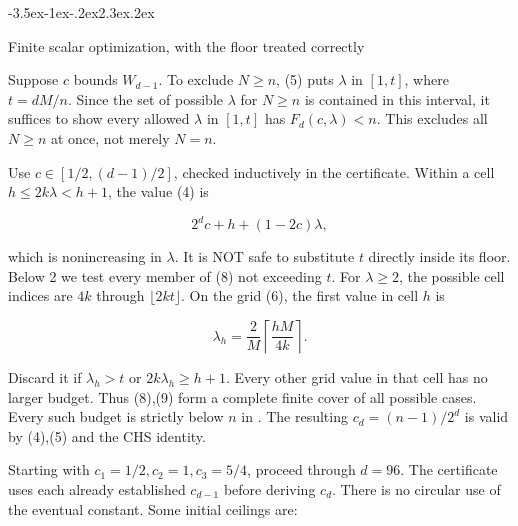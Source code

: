 \documentclass[11pt]{article}
\makeatletter
\renewcommand\section{\@startsection{section}{1}{\z@}
  {-3.5ex\@plus -1ex\@minus -.2ex}{2.3ex\@plus .2ex}
  {\normalfont\Large\bfseries\raggedright}}
\theoremstyle{remark}
\theoremstyle{correctionstyle}
\makeatother
\begin{document}
\section{Finite scalar optimization, with the floor treated correctly}\label{src-p056}\label{src-end-p056}

\leavevmode\label{src-p057}Suppose $c$ bounds $W_{d-1}$. To exclude $N\ge n$, (5) puts $\lambda$ in $[1,t]$,
where $t=dM/n$. Since the set of possible $\lambda$ for $N\ge n$ is contained in
this interval, it suffices to show every allowed $\lambda$ in $[1,t]$ has
$F_d(c,\lambda)<n$. This excludes all $N\ge n$ at once, not merely $N=n$.\label{src-end-p057}\par

\leavevmode\label{src-p058}Use $c\in[1/2,(d-1)/2]$, checked inductively in the certificate. Within a
cell $h\le2k\lambda<h+1$, the value (4) is\label{src-end-p058}\par

\begin{equation}
2^dc+h+(1-2c)\lambda,\tag*{}
\label{src-p059}
\end{equation}

\leavevmode\label{src-p060}which is nonincreasing in $\lambda$. It is NOT safe to substitute $t$ directly
inside its floor. Below 2 we test every member of (8) not exceeding $t$.
For $\lambda\ge2$, the possible cell indices are $4k$ through $\lfloor2kt\rfloor$.
On the grid (6), the first value in cell $h$ is\label{src-end-p060}\par

\begin{equation}
\lambda_h=\frac2M\left\lceil\frac{hM}{4k}\right\rceil.\tag{9}
\label{src-p061}
\end{equation}

\leavevmode\label{src-p062}Discard it if $\lambda_h>t$ or $2k\lambda_h\ge h+1$. Every other grid value in
that cell has no larger budget. Thus (8),(9) form a complete finite cover
of all possible cases. Every such budget is strictly below $n$ in .
The resulting $c_d=(n-1)/2^d$ is valid by (4),(5) and the CHS identity.\label{src-end-p062}\par

\leavevmode\label{src-p063}Starting with $c_1=1/2,c_2=1,c_3=5/4$, proceed through $d=96$. The certificate
uses each already established $c_{d-1}$ before deriving $c_d$. There is no
circular use of the eventual constant. Some initial ceilings are:\label{src-end-p063}\par
\end{document}
